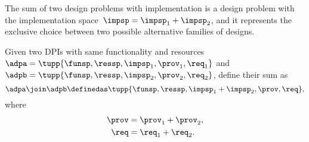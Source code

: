 The sum of two design problems with implementation is a design problem with the implementation space~$\impsp=\impsp_{1}+\impsp_{2}$, and it represents the exclusive choice between two possible alternative families of designs.

\begin{marginfigure}
    \centering
    \caption{}
    \label{fig:dpcoproduct}
\end{marginfigure}

\begin{definition}
    \label{def:parallel-1}
    Given two DPIs with same functionality and resources~$\adpa=\tupp{\funsp,\ressp,\impsp_{1},\prov_{1},\req_{1}}$ and~$\adpb=\tupp{\funsp,\ressp,\impsp_{2},\prov_{2},\req_{2}}$, define their sum as
    \begin{equation}
        \adpa\join\adpb\definedas\tupp{\funsp,\ressp,\impsp_{1}+\impsp_{2},\prov,\req} ,
    \end{equation}
    where
    \begin{equation}
        \begin{aligned}
            \prov & = \prov_1 + \prov_2, \\
            \req  & = \req_1 + \req_2.
        \end{aligned}
    \end{equation}

\end{definition}

%

